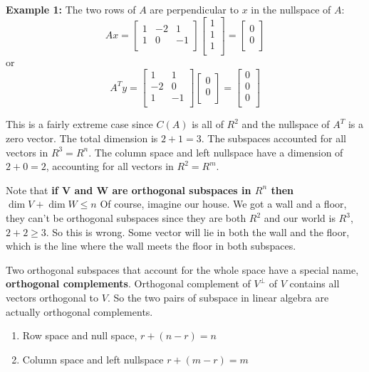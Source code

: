 \textbf{Example 1:} The two rows of \(A\) are perpendicular to \(x\) in the nullspace of \(A\): 
\[
    Ax = 
    \begin{bmatrix}
        1 & -2 & 1  \\
        1 & 0 & -1  \\
    \end{bmatrix}
    \begin{bmatrix}
         1 \\
         1 \\
         1 \\
    \end{bmatrix}
    = 
    \begin{bmatrix}
         0 \\
         0 \\
    \end{bmatrix}
\]
or
\[
    A^{T}y = 
    \begin{bmatrix}
        1 & 1  \\
        -2 & 0 \\
        1 & -1  \\
    \end{bmatrix}
    \begin{bmatrix}
         0 \\
         0 \\
    \end{bmatrix}
    = 
    \begin{bmatrix}
         0 \\
         0 \\
         0 \\
    \end{bmatrix}
\]   

This is a fairly extreme case since \(C(A)\) is all of  \(R^2\) and the nullspace of \(A^T\) is a zero vector. The total dimension is \(2 + 1 = 3\). The subspaces accounted for all vectors in \(R^3 = R^n\). The column space and left nullspace have a dimension of \(2 + 0 = 2\), accounting for all vectors in \(R^{2} = R^m\). 

Note that \textbf{if V and W are orthogonal subspaces in \(R^{n} \) then \(\dim V + \dim W \leq n\)    }
Of course, imagine our house. We got a wall and a floor, they can't be orthogonal subspaces since they are both \(R^2\) and our world is \(R^3\), \(2 + 2 \geq 3\). So this is wrong. Some vector will lie in both the wall and the floor, which is the line where the wall meets the floor in both subspaces. 

Two orthogonal subspaces that account for the whole space have a special name, \textbf{orthogonal complements}. Orthogonal complement of \(V^{\perp}\) of \(V\) contains all vectors orthogonal to \(V\).    
So the two pairs of subspace in linear algebra are actually orthogonal complements. 
\begin{enumerate}
    \item Row space and null space, \(r + ( n - r) = n\)
    \item Column space and left nullspace \(r + (m - r)= m\)  
\end{enumerate}

